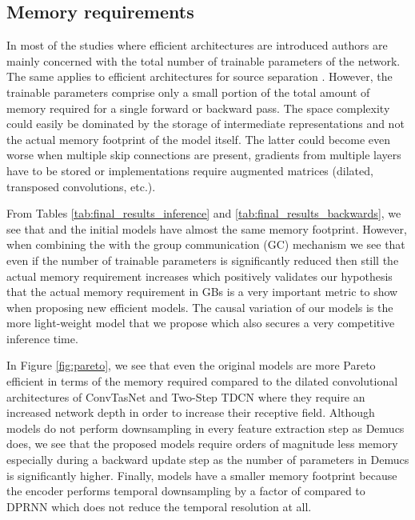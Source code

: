\subsection{Memory requirements}
\label{sec:results:mem_requirements}
In most of the studies where efficient architectures are introduced \cite{howard2017mobilenets,chollet2017xception_depthwiseseparable,mehta2019espnetv2,yu2019slimmablenets} authors are mainly concerned with the total number of trainable parameters of the network. The same applies to efficient architectures for source separation \cite{luo2019convTasNet,luo2019dual,maldonado2020lightweight}. However, the trainable parameters comprise only a small portion of the total amount of memory required for a single forward or backward pass. The space complexity could easily be dominated by the storage of intermediate representations and not the actual memory footprint of the model itself. The latter could become even worse when multiple skip connections are present, gradients from multiple layers have to be stored or implementations require augmented matrices (dilated, transposed convolutions, etc.).

From Tables \ref{tab:final_results_inference} and \ref{tab:final_results_backwards}, we see that \sudoi and the initial \sudo models have almost the same memory footprint. However, when combining the \sudoi with the group communication (GC) mechanism we see that even if the number of trainable parameters is significantly reduced then still the actual memory requirement increases which positively validates our hypothesis that the actual memory requirement in GBs is a very important metric to show when proposing new efficient models. The causal variation of our models \csudoi is the more light-weight model that we propose which also secures a very competitive inference time. 

In Figure \ref{fig:pareto}, we see that even the original \sudo models are more Pareto efficient in terms of the memory required compared to the dilated convolutional architectures of ConvTasNet \cite{luo2019convTasNet} and Two-Step TDCN \cite{tzinis2019two} where they require an increased network depth in order to increase their receptive field. Although \sudo models do not perform downsampling in every feature extraction step as Demucs \cite{defossez2019demucs} does, we see that the proposed models require orders of magnitude less memory especially during a backward update step as the number of parameters in Demucs is significantly higher. Finally, \sudo models have a smaller memory footprint because the encoder  performs temporal downsampling by a factor of  compared to DPRNN \cite{luo2019dual} which does not reduce the temporal resolution at all.



